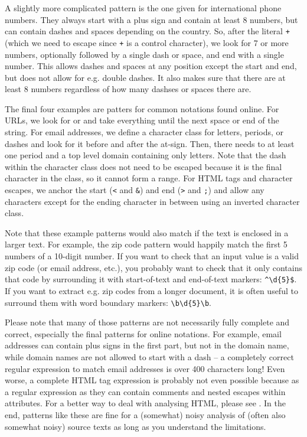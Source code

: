 A slightly more complicated pattern is the one given for international phone numbers.
They always start with a plus sign and contain at least 8 numbers, but can contain dashes and spaces depending on the country.
So, after the literal \verb|+| (which we need to escape since \verb|+| is a control character),
we look for 7 or more numbers, optionally followed by a single dash or space, and end with a single number.
This allows dashes and spaces at any position except the start and end, but does not allow for e.g. double dashes.
It also makes sure that there are at least 8 numbers regardless of how many dashses or spaces there are.

The final four examples are patters for common notations found online.  
For URLs, we look for  or  and take everything until the next space or end of the string.
For email addresses, we define a character class for letters, periods, or dashes and look for it before and after the at-sign.
Then, there needs to at least one period and a top level domain containing only letters.
Note that the dash within the character class does not need to be escaped because it is the final character in the class, so it cannot form a range.
For HTML tags and character escapes, we anchor the start (\verb|<| and \verb|&|) and end (\verb|>| and \verb|;|) and allow any characters except for the ending character in between
using an inverted character class.

Note that these example patterns would also match if the text is enclosed in a larger text.
For example, the zip code pattern would happily match the first 5 numbers of a 10-digit number.
If you want to check that an input value is a valid zip code (or email address, etc.),
you probably want to check that it only contains that code by surrounding it with start-of-text and end-of-text markers: \verb|^\d{5}$|.
If you want to extract e.g. zip codes from a longer document, it is often useful to surround them with word boundary markers: \verb|\b\d{5}\b|.

Please note that many of those patterns are not necessarily fully complete and correct, especially the final patterns for online notations.
For example, email addresses can contain plus signs in the first part, but not in the domain name, while domain names are not allowed to start with a dash -- a completely correct regular expression to match email addresses is over 400 characters long!
Even worse, a complete HTML tag expression is probably not even possible because as a regular expression as they can contain comments and nested escapes within attributes.
For a better way to deal with analysing HTML, please see . In the end, patterns like these are fine for a (somewhat) noisy analysis of (often also somewhat noisy) source texts as long as you understand the limitations. 
        
